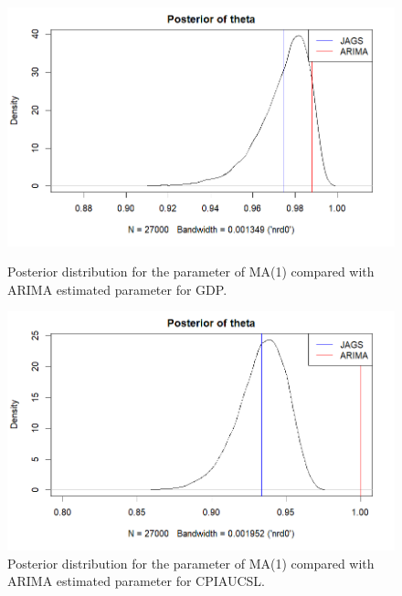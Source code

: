 \begin{figure}[H]
    \centering
    \begin{minipage}{0.49\textwidth}
        \centering
        \includegraphics[width=\textwidth]{images/3-MA/ARIMA_MA1_posterior_distribution_gdp.png}
        \caption{Posterior distribution for the parameter of MA(1) compared with ARIMA estimated parameter for GDP.}
        \label{fig:ARIMA_MA1_gdp_posteriors}
    \end{minipage}\hfill
    \begin{minipage}{0.49\textwidth}
        \centering
        \includegraphics[width=\textwidth]{images/3-MA/ARIMA_MA1_posterior_distribution_infl.png}
        \caption{Posterior distribution for the parameter of MA(1) compared with ARIMA estimated parameter for CPIAUCSL.}
        \label{fig:ARIMA_MA1_infl_posteriors}
    \end{minipage}
\end{figure}
